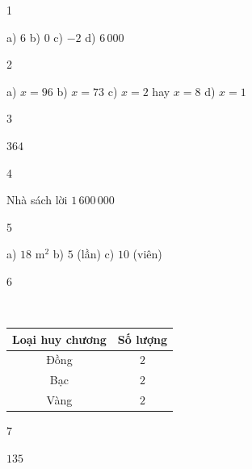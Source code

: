 \begin{Solbook}{1}
 \par \noindent  a) $6$ \hfill b) $0$ \hfill c) $-2$ \hfill d) $6\,000$  \hfill \qedEX 
\end{Solbook}
\begin{Solbook}{2}
 \par \noindent a) $x=96$ \hfill b) $x=73$ \hfill c) $x=2$ hay $x=8$ \hfill d) $x=1$ \hfill \qedEX 
\end{Solbook}
\begin{Solbook}{3}
 \par \noindent $364$ \hfill \qedEX 
\end{Solbook}
\begin{Solbook}{4}
 \par \noindent  Nhà sách lời $1\,600\,000$  \hfill \qedEX 
\end{Solbook}
\begin{Solbook}{5}
 \par \noindent a) $18$ m$^2$ \hfill b) $5$ (lần) \hfill c) $10$ (viên)  \hfill \qedEX 
\end{Solbook}
\begin{Solbook}{6}
 \par \noindent  \\ \begin {tabular}{|c|c|} \hline \textbf {Loại huy chương} & \textbf {Số lượng} \\ \hline Đồng & $2$ \\ \hline Bạc & $2$ \\ \hline Vàng & $2$ \\ \hline \end {tabular}  \hfill \qedEX 
\end{Solbook}
\begin{Solbook}{7}
 \par \noindent  $135$ \hfill \qedEX 
\end{Solbook}
